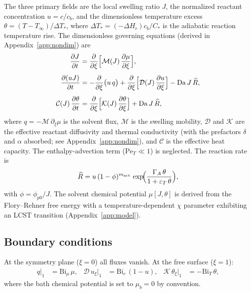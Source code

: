 \documentclass[aps,pre,reprint,superscriptaddress,longbibliography,floatfix]{revtex4-2}
\newcommand{\Ms}{\mathcal{M}}
\newcommand{\Ds}{\mathcal{D}}
\newcommand{\Cs}{\mathcal{C}}
\newcommand{\Ks}{\mathcal{K}}
\newcommand{\Da}{\mathrm{Da}}
\newcommand{\Bi}{\mathrm{Bi}}
\newcommand{\Pe}{\mathrm{Pe}}
\newcommand{\Rhat}{\widehat{R}}
\newcommand{\pp}{\phi_{p0}}
\begin{document}
The three primary fields are the local swelling ratio $J$, the normalized
reactant concentration $u=c/c_b$, and the
dimensionless temperature excess $\theta=(T-T_\infty)/\Delta T_*$,
where $\Delta T_*=(-\Delta H_r)c_b/C_*$ is the adiabatic reaction
temperature rise.
The dimensionless governing equations (derived in
Appendix~\ref{app:nondim}) are
\begin{subequations}
\label{eq:governing}
\begin{align}
  \frac{\partial J}{\partial t} &= \frac{\partial}{\partial \xi}
    \Bigl[\Ms(J)\,\frac{\partial\mu}{\partial\xi}\Bigr], \label{eq:gov_J}\\[4pt]
  \frac{\partial (uJ)}{\partial t} &=
    -\frac{\partial}{\partial\xi}\bigl(u\,q\bigr)
    + \frac{\partial}{\partial\xi}
    \Bigl[\Ds(J)\,\frac{\partial u}{\partial\xi}\Bigr]
    - \Da\,J\,\Rhat, \label{eq:gov_u}\\[4pt]
  \Cs(J)\,\frac{\partial\theta}{\partial t} &= \frac{\partial}{\partial\xi}
    \Bigl[\Ks(J)\,\frac{\partial\theta}{\partial\xi}\Bigr]
    + \Da\,J\,\Rhat, \label{eq:gov_theta}
\end{align}
\end{subequations}
where $q=-\Ms\,\partial_\xi\mu$ is the solvent flux, $\Ms$ is the
swelling mobility, $\Ds$ and $\Ks$ are the effective reactant
diffusivity and thermal conductivity (with the prefactors $\delta$
and $\alpha$ absorbed; see Appendix~\ref{app:nondim}), and $\Cs$ is
the effective heat capacity.  The enthalpy-advection term
($\Pe_T\ll 1$) is neglected.  The reaction rate is
\begin{equation}
  \Rhat = u\,(1-\phi)^{m_\mathrm{act}}\,
  \exp\!\Bigl(\frac{\Gamma_A\,\theta}{1+\varepsilon_T\,\theta}\Bigr),
  \label{eq:rxn}
\end{equation}
with $\phi = \pp/J$. The solvent chemical potential $\mu[J,\theta]$ is
derived from the Flory--Rehner free energy with a temperature-dependent
$\chi$ parameter exhibiting an LCST transition
(Appendix~\ref{app:model}).

\subsection{Boundary conditions}

At the symmetry plane ($\xi=0$) all fluxes vanish. At the free
surface ($\xi=1$):
\begin{align}
  q\big|_1&=\Bi_\mu\,\mu, &
  \Ds\,u_\xi\big|_1&=\Bi_c\,(1-u), &
  \Ks\,\theta_\xi\big|_1&=-\Bi_T\,\theta,
  \label{eq:bc}
\end{align}
where the bath chemical potential is set to $\mu_b=0$ by
convention.
\end{document}
